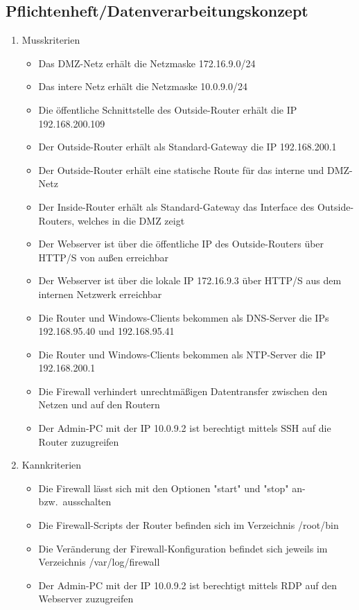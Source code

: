 \subsection{Pflichtenheft/Datenverarbeitungskonzept}
\label{sec:Pflichtenheft}
\begin{enumerate}

	\item Musskriterien
	
	\begin{itemize}
		\item Das DMZ-Netz erhält die Netzmaske 172.16.9.0/24
		\item Das intere Netz erhält die Netzmaske 10.0.9.0/24
		\item Die öffentliche Schnittstelle des Outside-Router erhält die IP 192.168.200.109
		\item Der Outside-Router erhält als Standard-Gateway die IP 192.168.200.1
		\item Der Outside-Router erhält eine statische Route für das interne und DMZ-Netz
		\item Der Inside-Router erhält als Standard-Gateway das Interface des Outside-Routers, welches in die DMZ zeigt
		\item Der Webserver ist über die öffentliche IP des Outside-Routers über HTTP/S von außen erreichbar
		\item Der Webserver ist über die lokale IP 172.16.9.3 über HTTP/S aus dem internen Netzwerk erreichbar
		\item Die Router und Windows-Clients bekommen als DNS-Server die IPs 192.168.95.40 und 192.168.95.41
		\item Die Router und Windows-Clients bekommen als NTP-Server die IP 192.168.200.1
		\item Die Firewall verhindert unrechtmäßigen Datentransfer zwischen den Netzen und auf den Routern
		\item Der Admin-PC mit der IP 10.0.9.2 ist berechtigt mittels SSH auf die Router zuzugreifen	
	\end{itemize}
	
	\item Kannkriterien
	
	\begin{itemize}
		\item Die Firewall lässt sich mit den Optionen "start" und "stop" an- bzw.\ ausschalten
		\item Die Firewall-Scripts der Router befinden sich im Verzeichnis /root/bin
		\item Die Veränderung der Firewall-Konfiguration befindet sich jeweils im Verzeichnis /var/log/firewall
		\item Der Admin-PC mit der IP 10.0.9.2 ist berechtigt mittels RDP auf den Webserver zuzugreifen
	\end{itemize}
\end{enumerate}



